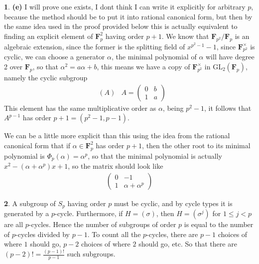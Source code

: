 \documentclass[10.5pt]{article}
\theoremstyle{definition}
\newtheorem{pb}{}
\begin{document}
\begin{pb}
        \textbf{(e)} I will prove one exists, I dont think I can write it explicitly for arbitrary \(p\), because the method should be to put it into rational canonical form, but then by the same idea used in the proof provided below this is actually equivalent to finding an explicit element of \(\mathbf{F}_p^2\) having order \(p+1\). We know that \(\mathbf{F}_{p^2}/\mathbf{F}_p\) is an algebraic extension, since the former is the splitting field of \(x^{p^2 - 1} - 1\), since \(\mathbf{F}_{p^2}^\times\) is cyclic, we can choose a generator \(\alpha\), the minimal polynomial of \(\alpha\) will have degree 2 over \(\mathbf{F}_p\), so that \(\alpha^2 = a\alpha + b\), this means we have a copy of \(\mathbf{F}_{p^2}^\times\) in \(\text{GL}_2(\mathbf{F}_p)\), namely the cyclic subgroup
        \begin{align*}
            &(A) &A = \begin{pmatrix} 0 & b \\ 1 & a \end{pmatrix}
        \end{align*}
        This element has the same multiplicative order as \(\alpha\), being \(p^2 - 1\), it follows that \(A^{p-1}\) has order \(p+1 = (p^2-1,p-1)\).

        We can be a little more explicit than this using the idea from the rational canonical form that if \(\alpha \in \mathbf{F}_{p}^2\) has order \(p+1\), then the other root to its minimal polynomial is \(\Phi_p(\alpha) = \alpha^p\), so that the minimal polynomial is actually \(x^2 - (\alpha + \alpha^p)x + 1 \), so the matrix should look like
        \begin{align*}
            \begin{pmatrix} 0 & -1 \\ 1 & \alpha + \alpha^p \end{pmatrix}
        \end{align*}
    \end{pb}
    \begin{pb}
        A subgroup of \(S_p\) having order \(p\) must be cyclic, and by cycle types it is generated by a \(p\)-cycle. Furthermore, if \(H = (\sigma)\), then \(H = (\sigma^j)\) for \(1 \leq j < p\) are all \(p\)-cycles. Hence the number of subgroups of order \(p\) is equal to the number of \(p\)-cycles divided by \(p-1\). To count all the \(p\)-cycles, there are \(p-1\) choices of where \(1\) should go, \(p-2\) choices of where \(2\) should go, etc. So that there are \((p-2)! = \frac{(p-1)!}{p-1}\) such subgroups.
    \end{pb}
\end{document}
